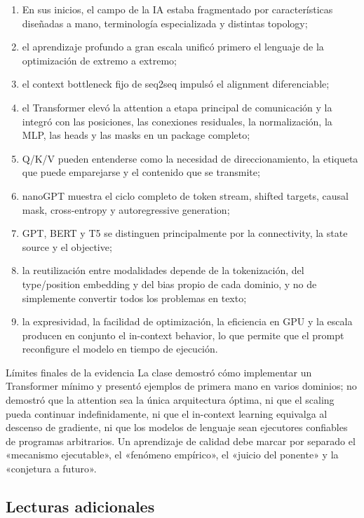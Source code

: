 \documentclass[a4paper]{article}
\begin{document}
\begin{enumerate}
  \item En sus inicios, el campo de la IA estaba fragmentado por características diseñadas a mano, terminología especializada y distintas topology;
  \item el aprendizaje profundo a gran escala unificó primero el lenguaje de la optimización de extremo a extremo;
  \item el context bottleneck fijo de seq2seq impulsó el alignment diferenciable;
  \item el Transformer elevó la attention a etapa principal de comunicación y la integró con las posiciones, las conexiones residuales, la normalización, la MLP, las heads y las masks en un package completo;
  \item Q/K/V pueden entenderse como la necesidad de direccionamiento, la etiqueta que puede emparejarse y el contenido que se transmite;
  \item nanoGPT muestra el ciclo completo de token stream, shifted targets, causal mask, cross-entropy y autoregressive generation;
  \item GPT, BERT y T5 se distinguen principalmente por la connectivity, la state source y el objective;
  \item la reutilización entre modalidades depende de la tokenización, del type/position embedding y del bias propio de cada dominio, y no de simplemente convertir todos los problemas en texto;
  \item la expresividad, la facilidad de optimización, la eficiencia en GPU y la escala producen en conjunto el in-context behavior, lo que permite que el prompt reconfigure el modelo en tiempo de ejecución.
\end{enumerate}

\begin{warningbox}{Límites finales de la evidencia}
La clase demostró cómo implementar un Transformer mínimo y presentó ejemplos de primera mano en varios dominios; no demostró que la attention sea la única arquitectura óptima, ni que el scaling pueda continuar indefinidamente, ni que el in-context learning equivalga al descenso de gradiente, ni que los modelos de lenguaje sean ejecutores confiables de programas arbitrarios. Un aprendizaje de calidad debe marcar por separado el «mecanismo ejecutable», el «fenómeno empírico», el «juicio del ponente» y la «conjetura a futuro».
\end{warningbox}

\subsection{Lecturas adicionales}
\end{document}
